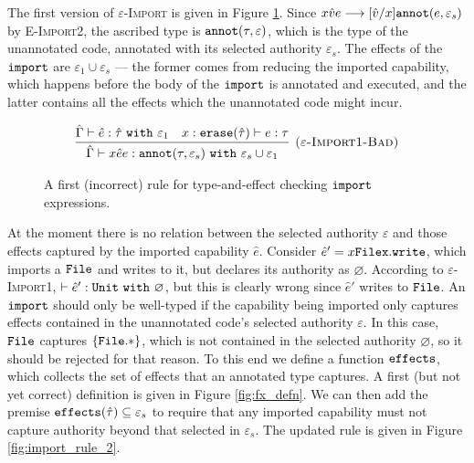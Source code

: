 The first version of \textsc{$\varepsilon$-Import} is given in Figure
\ref{fig:import_rule_1}. Since
${x}{\hat v}{e} \longrightarrow [\hat
v/x]\mathtt{annot}(e, \varepsilon_s)$ by \textsc{E-Import2}, the ascribed type
is $\mathtt{annot}(\tau, \varepsilon)$, which is the type of the unannotated
code, annotated with its selected authority $\varepsilon_s$. The
effects of the $\mathtt{import}$ are $\varepsilon_1 \cup \varepsilon_s$
--- the former comes from reducing the imported capability, which
happens before the body of the $\mathtt{import}$ is annotated and
executed, and the latter contains all the effects which the
unannotated code might incur.

\begin{figure}[h]

\[
\begin{array}{c}

\infer[\textsc{($\varepsilon$-Import1-Bad)}]
	{ \hat \Gamma \vdash {x}{\hat e}{e}: \kwa{annot}(\tau, \varepsilon_s)~\kw{with} \varepsilon_s \cup \varepsilon_1 }
	{ \hat \Gamma \vdash \hat e: \hat \tau~\kw{with} \varepsilon_1 & x: \kwa{erase}(\hat \tau) \vdash e: \tau }

\end{array}
\]
\vspace{-7pt}
\caption{A first (incorrect) rule for type-and-effect checking $\mathtt{import}$ expressions.}
\label{fig:import_rule_1}
\end{figure}

At the moment there is no relation between the selected authority
$\varepsilon$ and those effects captured by the imported capability
$\hat e$. Consider
$\hat e' = {x}{\mathtt{File}}{\mathtt{x.write}}$, which
imports a $\mathtt{File}$ and writes to it, but declares its authority as
$\varnothing$. According to \textsc{$\varepsilon$-Import1},
$\vdash \hat e': \mathtt{Unit}~\mathtt{with}~ \varnothing$, but this is clearly
wrong since $\hat e'$ writes to $\mathtt{File}$.  An $\mathtt{import}$
should only be well-typed if the capability being imported only
captures effects contained in the unannotated code's selected
authority $\varepsilon$. In this case, $\mathtt{File}$ captures
$\mathtt{ \{ File.* \}}$, which is not contained in the selected
authority $\varnothing$, so it should be rejected for that reason.  To
this end we define a function $\mathtt{effects}$, which collects the set
of effects that an annotated type captures. A first (but not yet
correct) definition is given in Figure \ref{fig:fx_defn}. We can then
add the premise $\mathtt{effects}(\hat \tau) \subseteq \varepsilon_s$ to
require that any imported capability must not capture authority beyond
that selected in $\varepsilon_s$. The updated rule is given in Figure
\ref{fig:import_rule_2}.

